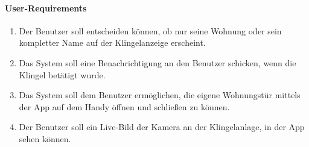 \paragraph{\large{User-Requirements}}
    \begin{enumerate}
        \item Der Benutzer soll entscheiden können, ob nur seine Wohnung oder sein kompletter Name auf der Klingelanzeige erscheint.
        \item Das System soll eine Benachrichtigung an den Benutzer schicken, wenn die Klingel betätigt wurde.
        \item Das System soll dem Benutzer ermöglichen, die eigene Wohnungstür mittels der App auf dem Handy öffnen und schließen zu können.
        \item Der Benutzer soll ein Live-Bild der Kamera an der Klingelanlage, in der App sehen können.
    \end{enumerate}


